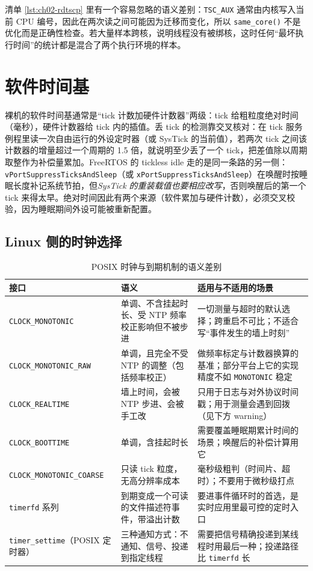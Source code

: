 \documentclass[12pt,a4paper,fontset=fandol]{ctexbook}
\newcommand{\Fn}[1]{\texttt{#1()}}
\newcommand{\Tp}[1]{\texttt{#1}}
\newcommand{\Bk}{\discretionary{}{}{}}
\begin{document}
清单 \ref{lst:ch02-rdtscp} 里有一个容易忽略的语义差别：\Tp{TSC\_AUX} 通常由内核写入当前 CPU 编号，因此在两次读之间可能因为迁移而变化，所以 \Fn{same\_core} 不是优化而是正确性检查。若大量样本跨核，说明线程没有被绑核，这时任何``最坏执行时间''的统计都是混合了两个执行环境的样本。

\section{软件时间基}

\label{sec:ch02-swbase}

裸机的软件时间基通常是``tick 计数加硬件计数器''两级：tick 给粗粒度绝对时间（毫秒），硬件计数器给 tick 内的插值。丢 tick 的检测靠交叉核对：在 tick 服务例程里读一次自由运行的外设定时器（或 SysTick 的当前值），若两次 tick 之间该计数器的增量超过一个周期的 1.5 倍，就说明至少丢了一个 tick，把差值除以周期取整作为补偿量累加。FreeRTOS 的 tickless idle 走的是同一条路的另一侧：\Tp{vPortSuppressTicksAndSleep}（或 \Tp{xPortSuppressTicksAndSleep}）在唤醒时按睡眠长度补记系统节拍，但\emph{SysTick 的重装载值也要相应改写}，否则唤醒后的第一个 tick 来得太早。绝对时间因此有两个来源（软件累加与硬件计数），必须交叉校验，因为睡眠期间外设可能被重新配置。

\subsection{Linux 侧的时钟选择}

\begin{table}[htbp]
\centering
\caption{POSIX 时钟与到期机制的语义差别}
\label{tab:ch02-linuxclocks}
\begin{tabular}{>{\raggedright\arraybackslash}p{}
                >{\raggedright\arraybackslash}p{}
                >{\raggedright\arraybackslash}p{}}
\toprule
接口 & 语义 & 适用与不适用的场景 \\
\midrule
\Tp{CLOCK\_MONOTONIC} & 单调、不含挂起时长、受 NTP 频率校正影响但不被步进 & 一切测量与超时的默认选择；跨重启不可比；不适合写``事件发生的墙上时刻'' \\
\Tp{CLOCK\_{\Bk}MONOTONIC\_{\Bk}RAW} & 单调，且完全不受 NTP 的调整（包括频率校正） & 做频率标定与计数器换算的基准；部分平台上它的实现精度不如 \Tp{MONOTONIC} 稳定 \\
\Tp{CLOCK\_REALTIME} & 墙上时间，会被 NTP 步进、会被手工改 & 只用于日志与对外协议时间戳；用于测量会遇到回拨（见下方 warning） \\
\Tp{CLOCK\_BOOTTIME} & 单调，含挂起时长 & 需要覆盖睡眠期累计时间的场景；唤醒后的补偿计算用它 \\
\Tp{CLOCK\_{\Bk}MONOTONIC\_{\Bk}COARSE} & 只读 tick 粒度，无高分辨率成本 & 毫秒级粗判（时间片、超时）；不要用于微秒级打点 \\
\Tp{timerfd} 系列 & 到期变成一个可读的文件描述符事件，带溢出计数 & 要进事件循环时的首选，是实时应用里最可控的定时入口 \\
\Tp{timer\_settime}（POSIX 定时器） & 三种通知方式：不通知、信号、投递到指定线程 & 需要把信号精确投递到某线程时用最后一种；投递路径比 \Tp{timerfd} 长 \\
\bottomrule
\end{tabular}
\end{table}
\end{document}
